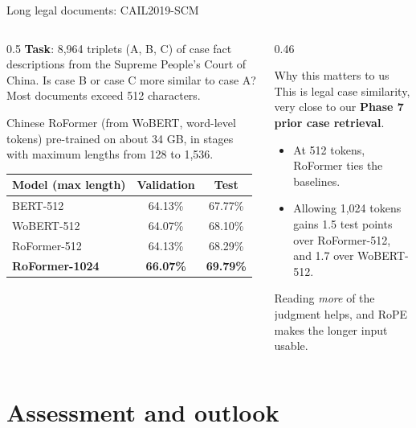 \documentclass[aspectratio=169,11pt]{beamer}
\begin{document}
\begin{frame}{Long legal documents: CAIL2019-SCM}
  \begin{columns}[T]
    \begin{column}{0.5\textwidth}
      \small
      \textbf{Task}: 8,964 triplets (A, B, C) of case fact descriptions from the Supreme People's Court of China. Is case B or case C more similar to case A? Most documents exceed 512 characters.
      \vspace{1mm}

      Chinese RoFormer (from WoBERT, word-level tokens) pre-trained on about 34 GB, in stages with maximum lengths from 128 to 1,536.
      \vspace{1mm}

      \footnotesize
      \begin{tabular}{@{}lcc@{}}
        \toprule
        Model (max length) & Validation & Test\\
        \midrule
        BERT-512 & 64.13\% & 67.77\%\\
        WoBERT-512 & 64.07\% & 68.10\%\\
        RoFormer-512 & 64.13\% & 68.29\%\\
        \textbf{RoFormer-1024} & \textbf{66.07\%} & \textbf{69.79\%}\\
        \bottomrule
      \end{tabular}
    \end{column}
    \begin{column}{0.46\textwidth}
      \begin{exampleblock}{Why this matters to us}
        \small
        This is legal case similarity, very close to our \textbf{Phase 7 prior case retrieval}.
        \begin{itemize}
          \item At 512 tokens, RoFormer ties the baselines.
          \item Allowing 1,024 tokens gains 1.5 test points over RoFormer-512, and 1.7 over WoBERT-512.
        \end{itemize}
        Reading \emph{more} of the judgment helps, and RoPE makes the longer input usable.
      \end{exampleblock}
    \end{column}
  \end{columns}
\end{frame}

\section{Assessment and outlook}
\end{document}
